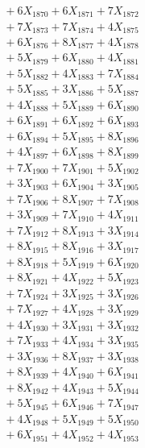 \documentclass[a4paper,10pt]{article}
\begin{document}
{\begin{align}
&\;  + 6 X_{1870} + 6 X_{1871} + 7 X_{1872} \\[0.3ex]
&\;  + 7 X_{1873} + 7 X_{1874} + 4 X_{1875} \\[0.3ex]
&\;  + 6 X_{1876} + 8 X_{1877} + 4 X_{1878} \\[0.3ex]
&\;  + 5 X_{1879} + 6 X_{1880} + 4 X_{1881} \\[0.3ex]
&\;  + 5 X_{1882} + 4 X_{1883} + 7 X_{1884} \\[0.3ex]
&\;  + 5 X_{1885} + 3 X_{1886} + 5 X_{1887} \\[0.3ex]
&\;  + 4 X_{1888} + 5 X_{1889} + 6 X_{1890} \\[0.3ex]
&\;  + 6 X_{1891} + 6 X_{1892} + 6 X_{1893} \\[0.3ex]
&\;  + 6 X_{1894} + 5 X_{1895} + 8 X_{1896} \\[0.3ex]
&\;  + 4 X_{1897} + 6 X_{1898} + 8 X_{1899} \\[0.5ex]\allowbreak
&\;  + 7 X_{1900} + 7 X_{1901} + 5 X_{1902} \\[0.3ex]
&\;  + 3 X_{1903} + 6 X_{1904} + 3 X_{1905} \\[0.3ex]
&\;  + 7 X_{1906} + 8 X_{1907} + 7 X_{1908} \\[0.3ex]
&\;  + 3 X_{1909} + 7 X_{1910} + 4 X_{1911} \\[0.3ex]
&\;  + 7 X_{1912} + 8 X_{1913} + 3 X_{1914} \\[0.3ex]
&\;  + 8 X_{1915} + 8 X_{1916} + 3 X_{1917} \\[0.3ex]
&\;  + 8 X_{1918} + 5 X_{1919} + 6 X_{1920} \\[0.3ex]
&\;  + 8 X_{1921} + 4 X_{1922} + 5 X_{1923} \\[0.3ex]
&\;  + 7 X_{1924} + 3 X_{1925} + 3 X_{1926} \\[0.3ex]
&\;  + 7 X_{1927} + 4 X_{1928} + 3 X_{1929} \\[0.5ex]\allowbreak
&\;  + 4 X_{1930} + 3 X_{1931} + 3 X_{1932} \\[0.3ex]
&\;  + 7 X_{1933} + 4 X_{1934} + 3 X_{1935} \\[0.3ex]
&\;  + 3 X_{1936} + 8 X_{1937} + 3 X_{1938} \\[0.3ex]
&\;  + 8 X_{1939} + 4 X_{1940} + 6 X_{1941} \\[0.3ex]
&\;  + 8 X_{1942} + 4 X_{1943} + 5 X_{1944} \\[0.3ex]
&\;  + 5 X_{1945} + 6 X_{1946} + 7 X_{1947} \\[0.3ex]
&\;  + 4 X_{1948} + 5 X_{1949} + 5 X_{1950} \\[0.3ex]
&\;  + 6 X_{1951} + 4 X_{1952} + 4 X_{1953} \\[0.3ex]

\end{align}}
\end{document}
